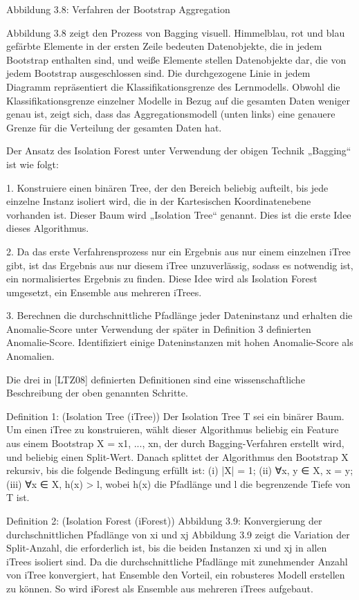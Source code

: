 Abbildung 3.8: Verfahren der Bootstrap Aggregation

Abbildung 3.8 zeigt den Prozess von Bagging visuell. Himmelblau, rot und blau gefärbte Elemente in der ersten Zeile bedeuten Datenobjekte, die in jedem Bootstrap enthalten sind, und weiße Elemente stellen Datenobjekte dar, die von jedem Bootstrap ausgeschlossen sind. Die durchgezogene Linie in jedem Diagramm repräsentiert die Klassifikationsgrenze des Lernmodells. Obwohl die Klassifikationsgrenze einzelner Modelle in Bezug auf die gesamten Daten weniger genau ist, zeigt sich, dass das Aggregationsmodell (unten links) eine genauere Grenze für die Verteilung der gesamten Daten hat.

Der Ansatz des Isolation Forest unter Verwendung der obigen Technik „Bagging“ ist wie folgt:

1. Konstruiere einen binären Tree, der den Bereich beliebig aufteilt, bis jede einzelne Instanz isoliert wird, die in der Kartesischen Koordinatenebene vorhanden ist. Dieser Baum wird „Isolation Tree“ genannt. Dies ist die erste Idee dieses Algorithmus.

2. Da das erste Verfahrensprozess nur ein Ergebnis aus nur einem einzelnen iTree gibt, ist das Ergebnis aus nur diesem iTree unzuverlässig, sodass es notwendig ist, ein normalisiertes Ergebnis zu finden. Diese Idee wird als Isolation Forest umgesetzt, ein Ensemble aus mehreren iTrees.

3. Berechnen die durchschnittliche Pfadlänge jeder Dateninstanz und erhalten die Anomalie-Score unter Verwendung der später in Definition 3 definierten Anomalie-Score. Identifiziert einige Dateninstanzen mit hohen Anomalie-Score als Anomalien.

Die drei in [LTZ08] definierten Definitionen sind eine wissenschaftliche Beschreibung der oben genannten Schritte.

Definition 1: (Isolation Tree (iTree))
Der Isolation Tree T sei ein binärer Baum. Um einen iTree zu konstruieren, wählt dieser Algorithmus beliebig ein Feature aus einem Bootstrap X = {x1, ..., xn}, der durch Bagging-Verfahren erstellt wird, und beliebig einen Split-Wert. Danach splittet der Algorithmus den Bootstrap X rekursiv, bis die folgende Bedingung erfüllt ist: (i) |X| = 1; (ii) ∀x, y ∈ X, x = y; (iii) ∀x ∈ X, h(x) > l, wobei h(x) die Pfadlänge und l die begrenzende Tiefe von T ist.

Definition 2: (Isolation Forest (iForest))
Abbildung 3.9: Konvergierung der durchschnittlichen Pfadlänge von xi und xj
Abbildung 3.9 zeigt die Variation der Split-Anzahl, die erforderlich ist, bis die beiden Instanzen xi und xj in allen iTrees isoliert sind. Da die durchschnittliche Pfadlänge mit zunehmender Anzahl von iTree konvergiert, hat Ensemble den Vorteil, ein robusteres Modell erstellen zu können. So wird iForest als Ensemble aus mehreren iTrees aufgebaut.

